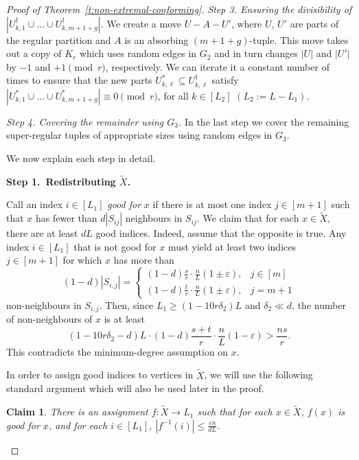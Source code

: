 \documentclass[reqno, 12pt]{amsart}
\numberwithin{equation}{section}
\numberwithin{figure}{section}
\theoremstyle{plain}
\newtheorem{claim}[thm]{Claim}
\theoremstyle{definition}
\let\eps=\varepsilon
\let\lra=\longrightarrow
\let\to=\lra
\begin{document}
\begin{proof}[Proof of Theorem~\ref{t:non-extremal-conforming}]
    \textit{Step 3. Ensuring the divisibility of $|U_{k,1}^\dagger\cup\dots\cup U_{k,m+1+g}^\dagger|$.} We create a move $U-A-U'$, where $U$, $U'$ are parts of the regular partition and $A$ is an absorbing $(m+1+g)$-tuple. This move takes out a copy of $K_r$ which uses random edges in $G_2$ and in turn changes $|U|$ and $|U'|$ by $-1 $ and $+1\pmod{r}$, respectively. We can iterate it a constant number of times to ensure that the new parts $U_{k,\ell}^* \subseteq U_{k,\ell}^\dagger$ satisfy $|U_{k,1}^*\cup\dots\cup U_{k,m+1+g}^*| \equiv 0 \pmod{r}$, for all $k\in[L_2]$ $(L_2:=L-L_1)$.

    \smallskip

    \textit{Step 4. Covering the remainder using $G_3$.} In the last step we cover the remaining super-regular tuples of appropriate sizes using random edges in $G_3$.

    \smallskip

    We now explain each step in detail.

    \smallskip

    \textbf{Step 1.~Redistributing $\tilde X$.} 
    
    \smallskip
    
    Call an index $i \in [L_1]$ \textit{good for} $x$ if there is at most one index $j\in[m+1]$ such that $x$ has fewer than $d|S_{ij}|$ neighbours in $S_{ij}$. We claim that for each $x\in \tilde X$, there are at least ${dL}$ good indices. Indeed, assume that the opposite is true. Any index $i\in[L_1]$ that is not good for $x$ must yield at least two indices $j\in[m+1]$ for which $x$ has more than 
    \[(1-d)|S_{i,j}| = \begin{cases}
        (1-d)\frac sr \cdot \frac nL (1\pm \eps), & j\in[m] \\
        (1-d)\frac tr \cdot \frac nL (1\pm \eps), & j=m+1
    \end{cases}\] 
    non-neighbours in $S_{i,j}$. Then, since $L_1\geq (1-10r\delta_2) L$ and $\delta_2 \ll d$, the number of non-neighbours of $x$ is at least
		$$(1-10r\delta_2-d)L\cdot(1-d)\frac{s+t}{r}\cdot\frac{n}{L}(1-\eps)>\frac{ns}{r}.$$ 
	This contradicts the minimum-degree assumption on $x$.

    In order to assign good indices to vertices in $\tilde X$, we will use the following standard argument which will also be used later in the proof.
    \begin{claim}\label{c:even-distribute-X}
        There is an assignment $f: \tilde X \to L_1$ such that for each $x\in \tilde X$, $f(x)$ is good for $x$, and for each $i \in [L_1]$, $|f^{-1}(i)| \leq \frac{\eps n}{dL}$.
    \end{claim}
    

\end{proof}
\end{document}
